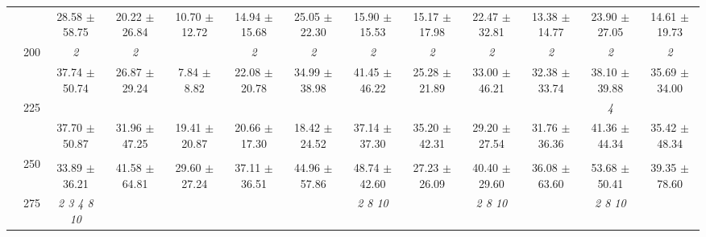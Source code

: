 \begin{table}[h]
{\begin{tabular}{
        ccccccccccccc}
 & & \cellcolor[HTML]{EFEFEF} 28.58 $\pm$ 58.75& \cellcolor[HTML]{EFEFEF} 20.22 $\pm$ 26.84& \cellcolor[HTML]{EFEFEF} 10.70 $\pm$ 12.72& \cellcolor[HTML]{EFEFEF} 14.94 $\pm$ 15.68& \cellcolor[HTML]{EFEFEF} 25.05 $\pm$ 22.30& \cellcolor[HTML]{EFEFEF} 15.90 $\pm$ 15.53& \cellcolor[HTML]{EFEFEF} 15.17 $\pm$ 17.98& \cellcolor[HTML]{EFEFEF} 22.47 $\pm$ 32.81& \cellcolor[HTML]{EFEFEF} 13.38 $\pm$ 14.77& \cellcolor[HTML]{EFEFEF} 23.90 $\pm$ 27.05& \cellcolor[HTML]{EFEFEF} 14.61 $\pm$ 19.73 \\ 
 & \multirow{2}{*}{200}& \textit{ 2 }& \textit{ 2 }& & \textit{ 2 }& \textit{ 2 }& \textit{ 2 }& \textit{ 2 }& \textit{ 2 }& \textit{ 2 }& \textit{ 2 }& \textit{ 2 } \\ 
 & & 37.74 $\pm$ 50.74& 26.87 $\pm$ 29.24& 7.84 $\pm$ 8.82& 22.08 $\pm$ 20.78& 34.99 $\pm$ 38.98& 41.45 $\pm$ 46.22& 25.28 $\pm$ 21.89& 33.00 $\pm$ 46.21& 32.38 $\pm$ 33.74& 38.10 $\pm$ 39.88& 35.69 $\pm$ 34.00 \\ 
 & \multirow{2}{*}{225}& \cellcolor[HTML]{EFEFEF} & \cellcolor[HTML]{EFEFEF} & \cellcolor[HTML]{EFEFEF} & \cellcolor[HTML]{EFEFEF} & \cellcolor[HTML]{EFEFEF} & \cellcolor[HTML]{EFEFEF} & \cellcolor[HTML]{EFEFEF} & \cellcolor[HTML]{EFEFEF} & \cellcolor[HTML]{EFEFEF} & \cellcolor[HTML]{EFEFEF} \textit{ 4 }& \cellcolor[HTML]{EFEFEF}  \\ 
 & & \cellcolor[HTML]{EFEFEF} 37.70 $\pm$ 50.87& \cellcolor[HTML]{EFEFEF} 31.96 $\pm$ 47.25& \cellcolor[HTML]{EFEFEF} 19.41 $\pm$ 20.87& \cellcolor[HTML]{EFEFEF} 20.66 $\pm$ 17.30& \cellcolor[HTML]{EFEFEF} 18.42 $\pm$ 24.52& \cellcolor[HTML]{EFEFEF} 37.14 $\pm$ 37.30& \cellcolor[HTML]{EFEFEF} 35.20 $\pm$ 42.31& \cellcolor[HTML]{EFEFEF} 29.20 $\pm$ 27.54& \cellcolor[HTML]{EFEFEF} 31.76 $\pm$ 36.36& \cellcolor[HTML]{EFEFEF} 41.36 $\pm$ 44.34& \cellcolor[HTML]{EFEFEF} 35.42 $\pm$ 48.34 \\ 
 & \multirow{2}{*}{250}& & & & & & & & & & &  \\ 
 & & 33.89 $\pm$ 36.21& 41.58 $\pm$ 64.81& 29.60 $\pm$ 27.24& 37.11 $\pm$ 36.51& 44.96 $\pm$ 57.86& 48.74 $\pm$ 42.60& 27.23 $\pm$ 26.09& 40.40 $\pm$ 29.60& 36.08 $\pm$ 63.60& 53.68 $\pm$ 50.41& 39.35 $\pm$ 78.60 \\ 
 & \multirow{2}{*}{275}& \cellcolor[HTML]{EFEFEF} \textit{  2  3  4  8 10 }& \cellcolor[HTML]{EFEFEF} & \cellcolor[HTML]{EFEFEF} & \cellcolor[HTML]{EFEFEF} & \cellcolor[HTML]{EFEFEF} & \cellcolor[HTML]{EFEFEF} \textit{  2  8 10 }& \cellcolor[HTML]{EFEFEF} & \cellcolor[HTML]{EFEFEF} \textit{  2  8 10 }& \cellcolor[HTML]{EFEFEF} & \cellcolor[HTML]{EFEFEF} \textit{  2  8 10 }& \cellcolor[HTML]{EFEFEF}  \\ 

\end{tabular}}
\end{table}
